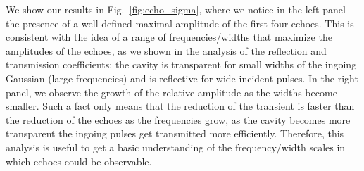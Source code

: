 \documentclass[article,aps,nofootinbib,twocolumn,superscriptaddress]{revtex4-1}
\begin{document}
We show our results in Fig.~\ref{fig:echo_sigma}, where we notice in the left panel the presence of a well-defined maximal amplitude of the first four echoes. This is consistent with the idea of a range of frequencies/widths that maximize the amplitudes of the echoes, as we shown in the analysis of the reflection and transmission coefficients: the cavity is transparent for small widths of the ingoing Gaussian (large frequencies) and is reflective for wide incident pulses. In the right panel, we observe the growth of the relative amplitude as the widths become smaller. Such a fact only means that the reduction of the transient is faster than the reduction of the echoes as the frequencies grow, as the cavity becomes more transparent the ingoing pulses get transmitted more efficiently. Therefore, this analysis is useful to get a basic understanding of the frequency/width scales in which echoes could be observable.  
\end{document}
